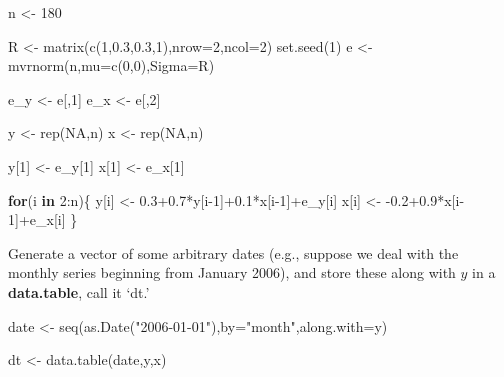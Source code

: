 \documentclass[
  oneside]{book}
\newenvironment{Shaded}{\begin{snugshade}}{\end{snugshade}}
\newcommand{\AttributeTok}[1]{\textcolor[rgb]{0.77,0.63,0.00}{#1}}
\newcommand{\ConstantTok}[1]{\textcolor[rgb]{0.00,0.00,0.00}{#1}}
\newcommand{\ControlFlowTok}[1]{\textcolor[rgb]{0.13,0.29,0.53}{\textbf{#1}}}
\newcommand{\DecValTok}[1]{\textcolor[rgb]{0.00,0.00,0.81}{#1}}
\newcommand{\FloatTok}[1]{\textcolor[rgb]{0.00,0.00,0.81}{#1}}
\newcommand{\FunctionTok}[1]{\textcolor[rgb]{0.00,0.00,0.00}{#1}}
\newcommand{\NormalTok}[1]{#1}
\newcommand{\OtherTok}[1]{\textcolor[rgb]{0.56,0.35,0.01}{#1}}
\newcommand{\SpecialCharTok}[1]{\textcolor[rgb]{0.00,0.00,0.00}{#1}}
\newcommand{\StringTok}[1]{\textcolor[rgb]{0.31,0.60,0.02}{#1}}
\begin{document}
\begin{Shaded}
\begin{Highlighting}[]
\NormalTok{n }\OtherTok{\textless{}{-}} \DecValTok{180}

\NormalTok{R }\OtherTok{\textless{}{-}} \FunctionTok{matrix}\NormalTok{(}\FunctionTok{c}\NormalTok{(}\DecValTok{1}\NormalTok{,}\FloatTok{0.3}\NormalTok{,}\FloatTok{0.3}\NormalTok{,}\DecValTok{1}\NormalTok{),}\AttributeTok{nrow=}\DecValTok{2}\NormalTok{,}\AttributeTok{ncol=}\DecValTok{2}\NormalTok{)}
\FunctionTok{set.seed}\NormalTok{(}\DecValTok{1}\NormalTok{)}
\NormalTok{e }\OtherTok{\textless{}{-}} \FunctionTok{mvrnorm}\NormalTok{(n,}\AttributeTok{mu=}\FunctionTok{c}\NormalTok{(}\DecValTok{0}\NormalTok{,}\DecValTok{0}\NormalTok{),}\AttributeTok{Sigma=}\NormalTok{R)}

\NormalTok{e\_y }\OtherTok{\textless{}{-}}\NormalTok{ e[,}\DecValTok{1}\NormalTok{]}
\NormalTok{e\_x }\OtherTok{\textless{}{-}}\NormalTok{ e[,}\DecValTok{2}\NormalTok{]}

\NormalTok{y }\OtherTok{\textless{}{-}} \FunctionTok{rep}\NormalTok{(}\ConstantTok{NA}\NormalTok{,n)}
\NormalTok{x }\OtherTok{\textless{}{-}} \FunctionTok{rep}\NormalTok{(}\ConstantTok{NA}\NormalTok{,n)}

\NormalTok{y[}\DecValTok{1}\NormalTok{] }\OtherTok{\textless{}{-}}\NormalTok{ e\_y[}\DecValTok{1}\NormalTok{]}
\NormalTok{x[}\DecValTok{1}\NormalTok{] }\OtherTok{\textless{}{-}}\NormalTok{ e\_x[}\DecValTok{1}\NormalTok{]}

\ControlFlowTok{for}\NormalTok{(i }\ControlFlowTok{in} \DecValTok{2}\SpecialCharTok{:}\NormalTok{n)\{}
\NormalTok{  y[i] }\OtherTok{\textless{}{-}} \FloatTok{0.3+0.7}\SpecialCharTok{*}\NormalTok{y[i}\DecValTok{{-}1}\NormalTok{]}\SpecialCharTok{+}\FloatTok{0.1}\SpecialCharTok{*}\NormalTok{x[i}\DecValTok{{-}1}\NormalTok{]}\SpecialCharTok{+}\NormalTok{e\_y[i]}
\NormalTok{  x[i] }\OtherTok{\textless{}{-}} \SpecialCharTok{{-}}\FloatTok{0.2+0.9}\SpecialCharTok{*}\NormalTok{x[i}\DecValTok{{-}1}\NormalTok{]}\SpecialCharTok{+}\NormalTok{e\_x[i]}
\NormalTok{\}}
\end{Highlighting}
\end{Shaded}

Generate a vector of some arbitrary dates (e.g., suppose we deal with the monthly series beginning from January 2006), and store these along with \(y\) in a \textbf{data.table}, call it `dt.'

\begin{Shaded}
\begin{Highlighting}[]
\NormalTok{date }\OtherTok{\textless{}{-}} \FunctionTok{seq}\NormalTok{(}\FunctionTok{as.Date}\NormalTok{(}\StringTok{"2006{-}01{-}01"}\NormalTok{),}\AttributeTok{by=}\StringTok{"month"}\NormalTok{,}\AttributeTok{along.with=}\NormalTok{y)}

\NormalTok{dt }\OtherTok{\textless{}{-}} \FunctionTok{data.table}\NormalTok{(date,y,x)}
\end{Highlighting}
\end{Shaded}
\end{document}

